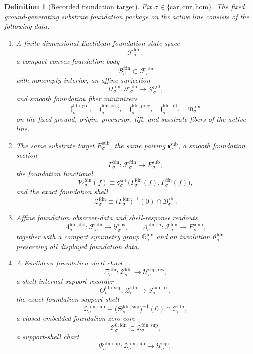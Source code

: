\documentclass[11pt]{article}
\newcommand{\Car}{\mathrm{car}}
\newcommand{\Cur}{\mathrm{cur}}
\newcommand{\Hom}{\mathrm{hom}}
\newcommand{\DataSpace}[1]{\mathcal Y_{#1}^{\mathrm{obs}}}
\newcommand{\AmbientTarget}[1]{E_{#1}^{\mathrm{amb}}}
\newcommand{\SubTarget}[1]{E_{#1}^{\mathrm{sub}}}
\newcommand{\SubPair}[1]{\mathfrak s_{#1}^{\mathrm{sub}}}
\newcommand{\GroundSpace}[1]{\mathcal G_{#1}^{\mathrm{grd}}}
\newcommand{\FoundSpace}[1]{\mathcal F_{#1}^{\mathrm{fdn}}}
\newcommand{\FoundBody}[1]{\mathcal B_{#1}^{\mathrm{fdn}}}
\newcommand{\FoundProj}[1]{\Pi_{#1}^{\mathrm{fdn}}}
\newcommand{\FoundGroundMin}[1]{\mathfrak f_{#1}^{\mathrm{fdn,grd}}}
\newcommand{\FoundOrigMin}[1]{\mathfrak f_{#1}^{\mathrm{fdn,orig}}}
\newcommand{\FoundPrecMin}[1]{\mathfrak f_{#1}^{\mathrm{fdn,prec}}}
\newcommand{\FoundLiftMin}[1]{\mathfrak f_{#1}^{\mathrm{fdn,lift}}}
\newcommand{\FoundSubMin}[1]{\mathfrak m_{#1}^{\mathrm{fdn}}}
\newcommand{\FoundSection}[1]{\Gamma_{#1}^{\mathrm{fdn}}}
\newcommand{\FoundFunctional}[1]{\mathscr W_{#1}^{\mathrm{fdn}}}
\newcommand{\FoundData}[1]{\Lambda_{#1}^{\mathrm{fdn,dat}}}
\newcommand{\FoundShellMap}[1]{\Lambda_{#1}^{\mathrm{fdn,sh}}}
\newcommand{\FoundShellSet}[1]{\mathcal Z_{#1}^{\mathrm{fdn}}}
\newcommand{\FoundSym}[1]{\mathbb G_{#1}^{\mathrm{fdn}}}
\newcommand{\FoundTime}[1]{\vartheta_{#1}^{\mathrm{fdn}}}
\newcommand{\FoundChart}[1]{\Xi_{#1}^{\mathrm{fdn}}}
\newcommand{\FoundSupport}[1]{\Theta_{#1}^{\mathrm{fdn,sup}}}
\newcommand{\FoundSupportShell}[1]{\mathcal Z_{#1}^{\mathrm{fdn,sup}}}
\newcommand{\FoundZeroCore}[1]{\mathcal Z_{#1}^{0,\mathrm{fdn}}}
\newcommand{\FoundEqChart}[1]{\Psi_{#1}^{\mathrm{fdn,sup}}}
\newcommand{\ResSpace}[1]{\mathcal U_{#1}^{\mathrm{sup,res}}}
\newcommand{\ResTarget}[1]{S_{#1}^{\mathrm{sup,res}}}
\newcommand{\EqnSpace}[1]{\mathcal U_{#1}^{\mathrm{eqn}}}
\newtheorem{definition}{Definition}
\begin{document}
\begin{definition}[Recorded foundation target]
\label{def:foundation}
Fix \(\sigma\in\{\Car,\Cur,\Hom\}\). The fixed ground-generating substrate foundation package on the active line consists of the following data.
\begin{enumerate}
    \item A finite-dimensional Euclidean foundation state space
    \[
    \FoundSpace{\sigma},
    \]
    a compact convex foundation body
    \[
    \FoundBody{\sigma}\subset\FoundSpace{\sigma}
    \]
    with nonempty interior, an affine surjection
    \[
    \FoundProj{\sigma}:\FoundSpace{\sigma}\to\GroundSpace{\sigma},
    \]
    and smooth foundation fiber minimizers
    \[
    \FoundGroundMin{\sigma},\quad
    \FoundOrigMin{\sigma},\quad
    \FoundPrecMin{\sigma},\quad
    \FoundLiftMin{\sigma},\quad
    \FoundSubMin{\sigma}
    \]
    on the fixed ground, origin, precursor, lift, and substrate fibers of the active line.
    \item The same substrate target \(\SubTarget{\sigma}\), the same pairing \(\SubPair{\sigma}\), a smooth foundation section
    \[
    \FoundSection{\sigma}:\FoundSpace{\sigma}\to\SubTarget{\sigma},
    \]
    the foundation functional
    \[
    \FoundFunctional{\sigma}(f)
    \equiv
    \SubPair{\sigma}\bigl(\FoundSection{\sigma}(f),\FoundSection{\sigma}(f)\bigr),
    \]
    and the exact foundation shell
    \[
    \FoundShellSet{\sigma}
    \equiv
    \bigl(\FoundSection{\sigma}\bigr)^{-1}(0)\cap\FoundBody{\sigma}.
    \]
    \item Affine foundation observer-data and shell-response readouts
    \[
    \FoundData{\sigma}:\FoundSpace{\sigma}\to\DataSpace{\sigma},
    \qquad
    \FoundShellMap{\sigma}:\FoundSpace{\sigma}\to\AmbientTarget{\sigma},
    \]
    together with a compact symmetry group \(\FoundSym{\sigma}\) and an involution \(\FoundTime{\sigma}\) preserving all displayed foundation data.
    \item A Euclidean foundation shell chart
    \[
    \FoundChart{\sigma}:\FoundShellSet{\sigma}\to\ResSpace{\sigma},
    \]
    a shell-internal support recorder
    \[
    \FoundSupport{\sigma}:\FoundShellSet{\sigma}\to\ResTarget{\sigma},
    \]
    the exact foundation support shell
    \[
    \FoundSupportShell{\sigma}
    \equiv
    \bigl(\FoundSupport{\sigma}\bigr)^{-1}(0)\cap\FoundShellSet{\sigma},
    \]
    a closed embedded foundation zero core
    \[
    \FoundZeroCore{\sigma}\subset\FoundSupportShell{\sigma},
    \]
    a support-shell chart
    \[
    \FoundEqChart{\sigma}:\FoundSupportShell{\sigma}\to\EqnSpace{\sigma},
\]
\end{enumerate}
\end{definition}
\end{document}
